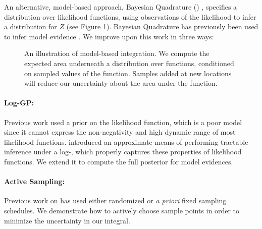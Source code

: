 \documentclass{article}
\begin{document}
An alternative, model-based approach, Bayesian Quadrature () \citep{BZHermiteQuadrature}, specifies a distribution over likelihood functions, using observations of the likelihood to infer a distribution for $Z$ (see Figure \ref{fig:model_based}). Bayesian Quadrature has previously been used to infer model evidence \citep{BZMonteCarlo}.  We improve upon this work in three ways:

\begin{figure}
\centering
{}
\caption{An illustration of model-based integration.  We compute the expected area underneath a distribution over functions, conditioned on sampled values of the function.  Samples added at new locations will reduce our uncertainty about the area under the function.}
\label{fig:model_based}
\end{figure}




\paragraph*{Log-GP:} Previous work used a \gpb prior on the likelihood function, which is a poor model since it cannot express the non-negativity and high dynamic range of most likelihood functions. \citet{BQR} introduced an approximate means of performing tractable inference under a log-\gp, which properly captures these properties of likelihood functions. We extend it to compute the full posterior for model evidences.

\paragraph*{Active Sampling:} Previous work on  has used either randomized or {\it a priori} fixed sampling schedules. We demonstrate how to actively choose sample points in order to minimize the uncertainty in our integral.

\end{document}
